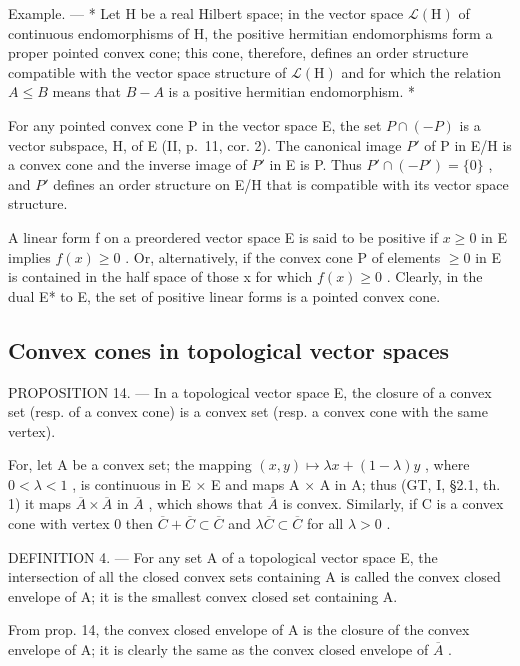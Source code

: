 Example. --- * Let H be a real Hilbert space; in the vector space \(\mathcal{L}(\mathrm{H})\) of continuous endomorphisms of H, the positive hermitian endomorphisms form a proper pointed convex cone; this cone, therefore, defines an order structure compatible with the vector space structure of \(\mathcal{L}(\mathrm{H})\) and for which the relation \(A \leqslant B\) means that \(B - A\) is a positive hermitian endomorphism. *

For any pointed convex cone P in the vector space E, the set \(P \cap (-P)\) is a vector subspace, H, of E (II, p.~11, cor. 2). The canonical image \(P'\) of P in E/H is a convex cone and the inverse image of \(P'\) in E is P. Thus \(P' \cap (-P') = \{0\}\) , and \(P'\) defines an order structure on E/H that is compatible with its vector space structure.

A linear form f on a preordered vector space E is said to be positive if \(x \geqslant 0\) in E implies \(f(x) \geqslant 0\) . Or, alternatively, if the convex cone P of elements \(\geqslant 0\) in E is contained in the half space of those x for which \(f(x) \geqslant 0\) . Clearly, in the dual E* to E, the set of positive linear forms is a pointed convex cone.

\subsection{Convex cones in topological vector spaces}

PROPOSITION 14. --- In a topological vector space E, the closure of a convex set (resp. of a convex cone) is a convex set (resp. a convex cone with the same vertex).

For, let A be a convex set; the mapping \((x, y) \mapsto \lambda x + (1 - \lambda)y\) , where \(0 < \lambda < 1\) , is continuous in E × E and maps A × A in A; thus (GT, I, §2.1, th. 1) it maps \(\overline{A} \times \overline{A}\) in \(\overline{A}\) , which shows that \(\overline{A}\) is convex. Similarly, if C is a convex cone with vertex 0 then \(\overline{C} + \overline{C} \subset \overline{C}\) and \(\lambda\overline{C} \subset \overline{C}\) for all \(\lambda > 0\) .

DEFINITION 4. --- For any set A of a topological vector space E, the intersection of all the closed convex sets containing A is called the convex closed envelope of A; it is the smallest convex closed set containing A.

From prop. 14, the convex closed envelope of A is the closure of the convex envelope of A; it is clearly the same as the convex closed envelope of \(\overline{A}\) .

